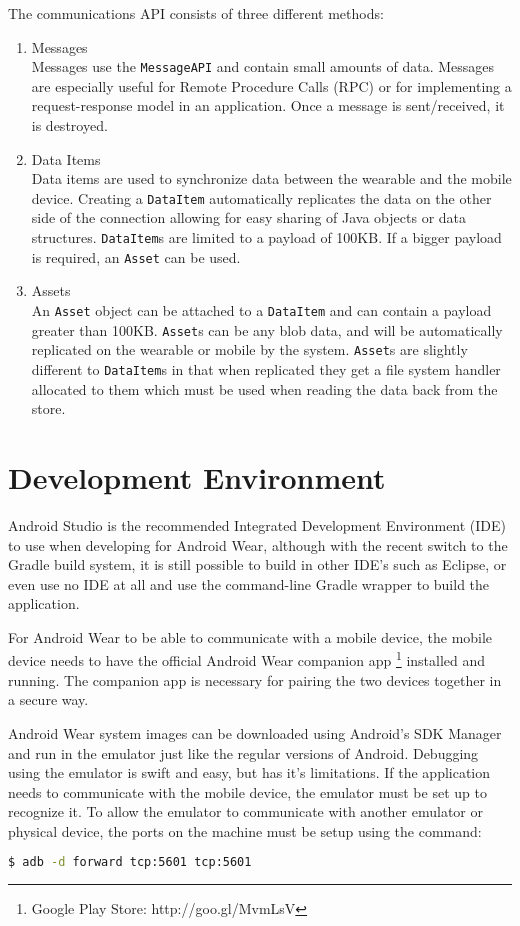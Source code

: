 The communications API consists of three different methods:
\begin{enumerate}

\item Messages\\
Messages use the \texttt{MessageAPI} and contain small amounts of data. Messages
are especially useful for Remote Procedure Calls (RPC) or for implementing a
request-response model in an application. Once a message is sent/received, it
is destroyed.
\item Data Items\\
Data items are used to synchronize data between the wearable and the mobile
device. Creating a \texttt{DataItem} automatically replicates the data on the
other side of the connection allowing for easy sharing of Java objects or data
structures. \texttt{DataItem}s are limited to a payload of 100KB. If a bigger
payload is required, an \texttt{Asset} can be used.
\item Assets\\
An \texttt{Asset} object can be attached to a \texttt{DataItem} and can contain
a payload greater than 100KB. \texttt{Asset}s can be any blob data, and will be
automatically replicated on the wearable or mobile by the system.
\texttt{Asset}s are slightly different to \texttt{DataItem}s in that when
replicated they get a file system handler allocated to them which must be used
when reading the data back from the store.

\end{enumerate}

\section{Development Environment}
Android Studio is the recommended Integrated Development Environment (IDE) to
use when developing for Android Wear, although with the recent switch to the
Gradle build system, it is still possible to build in other IDE's such as
Eclipse, or even use no IDE at all and use the command-line Gradle wrapper to
build the application.

For Android Wear to be able to communicate with a mobile device, the mobile
device needs to have the official Android Wear companion app
\footnote{Google Play Store: http://goo.gl/MvmLsV}
installed and running. The companion app is necessary for pairing the two
devices together in a secure way.

Android Wear system images can be downloaded using Android's SDK Manager and run
in the emulator just like the regular versions of Android. Debugging using the
emulator is swift and easy, but has it's limitations. If the application needs
to communicate with the mobile device, the emulator must be set up to recognize
it. To allow the emulator to communicate with another emulator or physical
device, the ports on the machine must be setup using the command:
\begin{lstlisting}[language=Bash]
$ adb -d forward tcp:5601 tcp:5601
\end{lstlisting}


